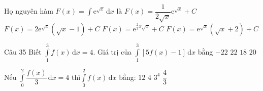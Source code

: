 \begin{ex}%
Họ nguyên hàm $F(x)=\displaystyle\int\mathrm{e}^{\sqrt{x}}\mathrm{\,d}x$ là
\choice
{$F(x)=\dfrac{1}{2\sqrt{x}}\mathrm{e}^{\sqrt{x}}+C$}
{\True $F(x)=2\mathrm{e}^{\sqrt{x}}\left(\sqrt{x}-1\right)+C$}
{$F(x)=\mathrm{e}^{\tfrac{2}{3}x\sqrt{x}}+C$}
{$F(x)=\mathrm{e}^{\sqrt{x}}\left(\sqrt{x}+2\right)+C$}
\end{ex}

\begin{ex}Câu 35%
Biết $\displaystyle\int\limits_1^3 f(x)\mathrm{\,d}x=4$. Giá trị của $\displaystyle\int\limits_1^3 [5f(x)-1]\mathrm{\,d}x$ bằng
\choice
{$-22$}
{$22$}
{\True $18$}
{$20$}
\end{ex}

\begin{ex}%
Nếu $\displaystyle\int\limits_0^2 \dfrac{f\left( x \right)}{3} \mathrm{\,d}x=4$ thì$\displaystyle\int\limits_0^2 f\left( x \right)\mathrm{\,d}x $ bằng:
\choice
{\True $12$}
{ $4$}
{ $3^4$}
{ $\dfrac{4}{3}$}
\end{ex}


